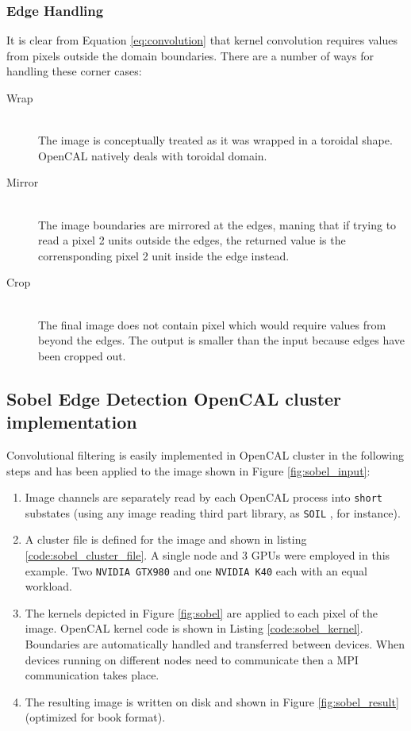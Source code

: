 \subsubsection{Edge Handling}
It is clear from Equation \ref{eq:convolution} that kernel convolution requires values from pixels outside the domain boundaries. There are a number of ways for handling these corner cases:
\begin{description}
	\item[Wrap] \hfill \\The image is conceptually treated as it was wrapped in a toroidal shape. OpenCAL natively deals with toroidal domain.
	\item[Mirror] \hfill \\
	The image boundaries are mirrored at the edges, maning that if trying to read a pixel 2 units outside the edges, the returned value is the corrensponding pixel 2 unit inside the edge instead.
	\item [Crop]\hfill \\
	The final image does not contain pixel which would require values from beyond the edges. The output is smaller than the input because edges have been cropped out.
\end{description}

\subsection{Sobel Edge Detection OpenCAL cluster implementation}
\label{sec:convolutional_filters_example}
Convolutional filtering is easily implemented in OpenCAL cluster in the following steps and has been applied to the image shown in Figure \ref{fig:sobel_input}:
\begin{enumerate}
    \item Image channels are separately read by each OpenCAL process into \texttt{short} substates (using any image reading third part library, as \texttt{SOIL} \cite{SOIL}, for instance).
    \item A cluster file is defined for the image and shown in listing \ref{code:sobel_cluster_file}. A single node and 3 GPUs were employed in this example. Two \texttt{NVIDIA GTX980} and one \texttt{NVIDIA K40} each with an equal workload.
    \item The kernels depicted in Figure \ref{fig:sobel} are applied to each pixel of the image. OpenCAL kernel code is shown in Listing \ref{code:sobel_kernel}.  Boundaries are automatically handled and transferred  between devices. When devices running on different nodes need to communicate then a MPI communication takes place.
    \item The resulting image is written on disk and  shown in Figure \ref{fig:sobel_result} (optimized for book format).
\end{enumerate}

